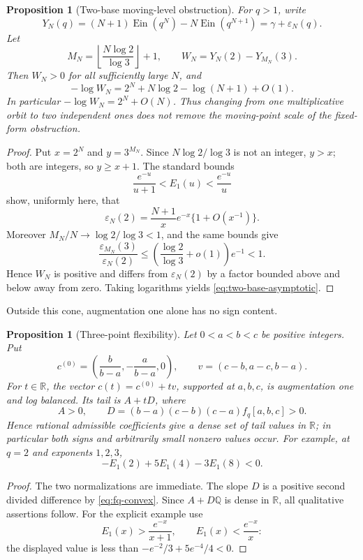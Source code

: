 \documentclass[11pt]{article}
\newtheorem{proposition}[theorem]{Proposition}
\theoremstyle{definition}
\theoremstyle{remark}
\newcommand{\Q}{\mathbb Q}
\newcommand{\R}{\mathbb R}
\newcommand{\Ein}{\operatorname{Ein}}
\begin{document}
\begin{proposition}[Two-base moving-level obstruction]
\label{prop:two-base-obstruction}
For \(q>1\), write
\[
 Y_N(q)=(N+1)\Ein(q^N)-N\Ein(q^{N+1})
       =\gamma+\varepsilon_N(q).
\]
Let
\[
 M_N=\left\lfloor\frac{N\log2}{\log3}\right\rfloor+1,
 \qquad W_N=Y_N(2)-Y_{M_N}(3).
\]
Then \(W_N>0\) for all sufficiently large \(N\), and
\begin{equation}\label{eq:two-base-asymptotic}
 \boxed{\displaystyle
 -\log W_N
 =2^N+N\log2-\log(N+1)+O(1).}
\end{equation}
In particular \(-\log W_N=2^N+O(N)\).  Thus changing from one
multiplicative orbit to two independent ones does not remove the
moving-point scale of the fixed-form obstruction.
\end{proposition}

\begin{proof}
Put \(x=2^N\) and \(y=3^{M_N}\).  Since
\(N\log2/\log3\) is not an integer, \(y>x\); both are integers, so
\(y\ge x+1\).  The standard bounds
\[
 \frac{e^{-u}}{u+1}<E_1(u)<\frac{e^{-u}}u
\]
show, uniformly here, that
\[
 \varepsilon_N(2)
 =\frac{N+1}{x}e^{-x}\{1+O(x^{-1})\}.
\]
Moreover \(M_N/N\to\log2/\log3<1\), and the same bounds give
\[
 \frac{\varepsilon_{M_N}(3)}{\varepsilon_N(2)}
 \le
 \left(\frac{\log2}{\log3}+o(1)\right)e^{-1}<1.
\]
Hence \(W_N\) is positive and differs from \(\varepsilon_N(2)\) by a
factor bounded above and below away from zero.  Taking logarithms yields
\eqref{eq:two-base-asymptotic}.
\end{proof}

Outside this cone, augmentation one alone has no sign content.

\begin{proposition}[Three-point flexibility]
\label{prop:three-point-flexibility}
Let \(0<a<b<c\) be positive integers.  Put
\[
 c^{(0)}=\left(\frac b{b-a},-\frac a{b-a},0\right),
 \qquad
 v=(c-b,a-c,b-a).
\]
For \(t\in\R\), the vector \(c(t)=c^{(0)}+tv\), supported at \(a,b,c\),
is augmentation one and log balanced.  Its tail is \(A+tD\), where
\[
 A>0,
 \qquad
 D=(b-a)(c-b)(c-a)f_q[a,b,c]>0.
\]
Hence rational admissible coefficients give a dense set of tail values in
\(\R\); in particular both signs and arbitrarily small nonzero values occur.
For example, at \(q=2\) and exponents \(1,2,3\),
\[
 -E_1(2)+5E_1(4)-3E_1(8)<0.
\]
\end{proposition}

\begin{proof}
The two normalizations are immediate.  The slope \(D\) is a positive second
divided difference by \eqref{eq:fq-convex}.  Since \(A+D\Q\) is dense in
\(\R\), all qualitative assertions follow.  For the explicit example use
\[
 E_1(x)>\frac{e^{-x}}{x+1},
 \qquad
 E_1(x)<\frac{e^{-x}}x:
\]
the displayed value is less than
\(-e^{-2}/3+5e^{-4}/4<0\).
\end{proof}
\end{document}
